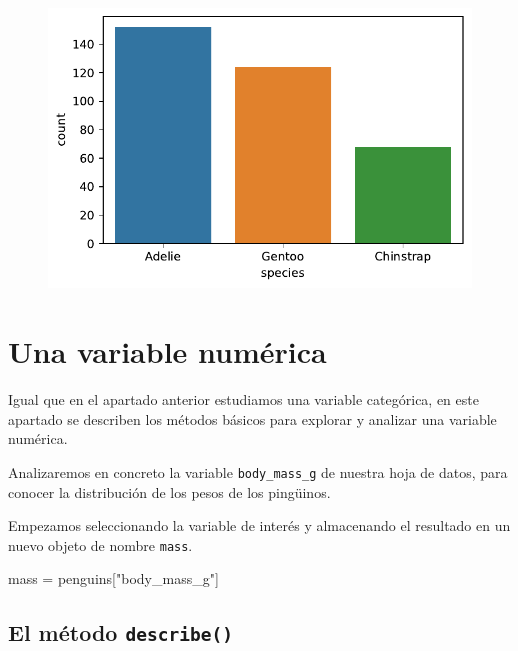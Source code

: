 \documentclass[
  a4paper,
  noprof,
  12pt,
  notoc,
  nosols,
  nobib]{mnye}
\newenvironment{Shaded}{\begin{snugshade}}{\end{snugshade}}
\newcommand{\NormalTok}[1]{\textcolor[rgb]{0.00,0.23,0.31}{#1}}
\newcommand{\OperatorTok}[1]{\textcolor[rgb]{0.37,0.37,0.37}{#1}}
\newcommand{\StringTok}[1]{\textcolor[rgb]{0.13,0.47,0.30}{#1}}
\theoremstyle{definition}
\theoremstyle{remark}
\begin{document}
\begin{figure}[tbph]

{\centering \includegraphics{chapters/1categorical_files/figure-pdf/cell-13-output-1.pdf}

}

\end{figure}


\hypertarget{sec-1numerical}{%
\section{Una variable numérica}\label{sec-1numerical}}

Igual que en el apartado anterior estudiamos una variable categórica, en
este apartado se describen los métodos básicos para explorar y analizar
una variable numérica.

Analizaremos en concreto la variable \texttt{body\_mass\_g} de nuestra
hoja de datos, para conocer la distribución de los pesos de los
pingüinos.

Empezamos seleccionando la variable de interés y almacenando el
resultado en un nuevo objeto de nombre \texttt{mass}.

\begin{Shaded}
\begin{Highlighting}[]
\NormalTok{mass }\OperatorTok{=}\NormalTok{ penguins[}\StringTok{"body\_mass\_g"}\NormalTok{]}
\end{Highlighting}
\end{Shaded}

\hypertarget{sec-1numerical-describe}{%
\subsection{\texorpdfstring{El método
\texttt{describe()}}{El método describe()}}\label{sec-1numerical-describe}}
\end{document}
